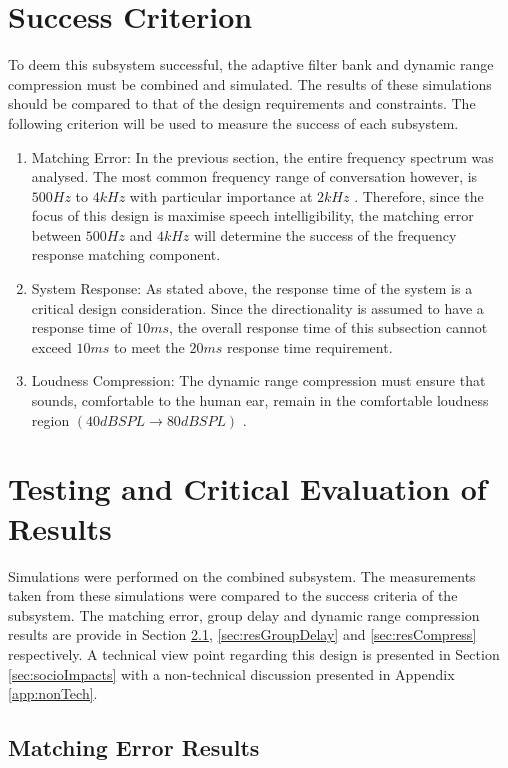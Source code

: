 \documentclass[11pt,onecolumn]{witseiepaper}
\begin{document}
\section{Success Criterion}

\noindent To deem this subsystem successful, the adaptive filter bank and dynamic range compression must be combined and simulated. The results of these simulations should be compared to that of the design requirements and constraints.  The following criterion will be used to measure the success of each subsystem.

\begin{enumerate}
	\item Matching Error: In the previous section, the entire frequency spectrum was analysed. The most common frequency range of conversation however, is $500Hz$ to $4kHz$ with particular importance at $2kHz$ \cite{speechDPA}. Therefore, since the focus of this design is maximise speech intelligibility, the matching error between $500Hz$ and $4kHz$ will determine the success of the frequency response matching component.
	\item System Response: As stated above, the response time of the system is a critical design consideration. Since the directionality is assumed to have a response time of $10ms$, the overall response time of this subsection cannot exceed $10ms$ to meet the $20ms$ response time requirement.
	\item Loudness Compression: The dynamic range compression must ensure that sounds, comfortable to the human ear, remain in the comfortable loudness region $(40dBSPL \rightarrow 80dBSPL)$ \cite{loudRange}.
\end{enumerate}


\section{Testing and Critical Evaluation of Results}

\noindent Simulations were performed on the combined subsystem. The measurements taken from these simulations were compared to the success criteria of the subsystem. The matching error, group delay and dynamic range compression results are provide in Section \ref{sec:resMatErr}, \ref{sec:resGroupDelay} and \ref{sec:resCompress} respectively. A technical view point regarding this design is presented in Section \ref{sec:socioImpacts} with a non-technical discussion presented in Appendix \ref{app:nonTech}.
 
	\subsection{Matching Error Results}
\label{sec:resMatErr}
\end{document}
